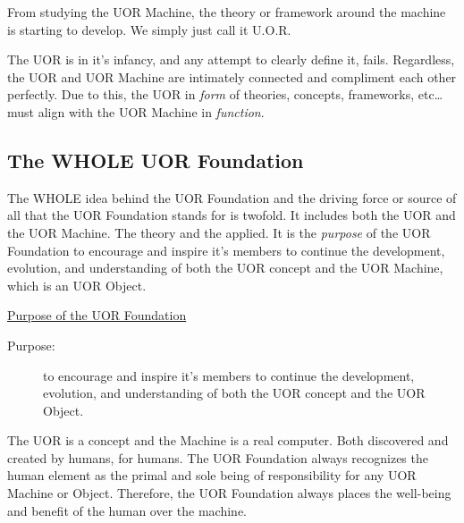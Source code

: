 \documentclass[twocolumn,10pt]{article}
\begin{document}
From studying the UOR Machine, the theory or framework around the machine is starting to develop.
We simply just call it U.O.R.

The UOR is in it's infancy, and any attempt to clearly define it, fails.
Regardless, the UOR and UOR Machine are intimately connected and compliment each other perfectly.
Due to this, the UOR in \textit{form} of theories, concepts, frameworks, etc\ldots must align with the UOR Machine in \textit{function}.
\subsection*{The WHOLE UOR Foundation}

The WHOLE idea behind the UOR Foundation and the driving force or source of all that the UOR Foundation stands for is twofold.
It includes both the UOR and the UOR Machine.
The theory and the applied.
It is the \textit{purpose} of the UOR Foundation to encourage and inspire it's members to continue the development, evolution, and understanding of both the UOR concept and the UOR Machine, which is an UOR Object.

\vspace{20pt}
\begin{minipage}{0.95\linewidth}
    \begin{tcolorbox}
    \begin{center}\underline{Purpose of the UOR Foundation}\end{center}
        \begin{description}
            \item[Purpose:] to encourage and inspire it's members to continue the development, evolution, and understanding of both the UOR concept and the UOR Object.
        \end{description}
    \end{tcolorbox}
\end{minipage}
\vspace{10pt}


The UOR is a concept and the Machine is a real computer.
Both discovered and created by humans, for humans.
The UOR Foundation always recognizes the human element as the primal and sole being of responsibility for any UOR Machine or Object.
Therefore, the UOR Foundation always places the well-being and benefit of the human over the machine.
\end{document}

